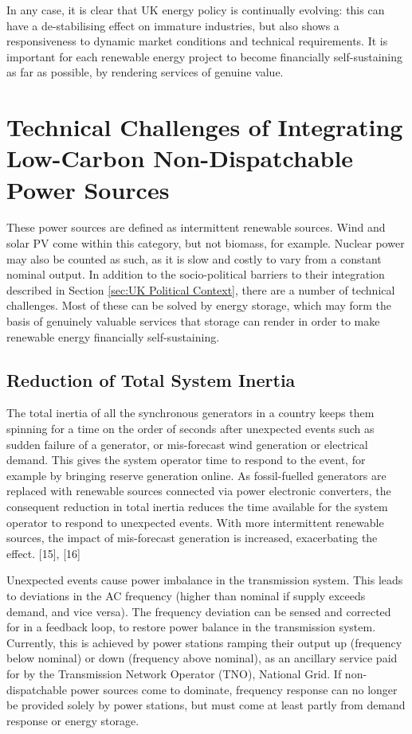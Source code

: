 \documentclass[report_18month.tex]{subfiles}
\begin{document}
In any case, it is clear that UK energy policy is continually evolving: this can have a de-stabilising effect on immature industries, but also shows a responsiveness to dynamic market conditions and technical requirements. It is important for each renewable energy project to become financially self-sustaining as far as possible, by rendering services of genuine value.

\section{Technical Challenges of Integrating Low-Carbon Non-Dispatchable Power Sources}
\label{sec:Technical Challenges of Integrating Low-Carbon Non-Dispatchable Power Sources}
These power sources are defined as intermittent renewable sources. Wind and solar PV come within this category, but not biomass, for example. Nuclear power may also be counted as such, as it is slow and costly to vary from a constant nominal output. In addition to the socio-political barriers to their integration described in Section \ref{sec:UK Political Context}, there are a number of technical challenges. Most of these can be solved by energy storage, which may form the basis of genuinely valuable services that storage can render in order to make renewable energy financially self-sustaining.

\subsection{Reduction of Total System Inertia}
\label{sec:Reduction of Total System Inertia}
The total inertia of all the synchronous generators in a country keeps them spinning for a time on the order of seconds after unexpected events such as sudden failure of a generator, or mis-forecast wind generation or electrical demand. This gives the system operator time to respond to the event, for example by bringing reserve generation online. As fossil-fuelled generators are replaced with renewable sources connected via power electronic converters, the consequent reduction in total inertia reduces the time available for the system operator to respond to unexpected events. With more intermittent renewable sources, the impact of mis-forecast generation is increased, exacerbating the effect. [15], [16]

Unexpected events cause power imbalance in the transmission system. This leads to deviations in the AC frequency (higher than nominal if supply exceeds demand, and vice versa). The frequency deviation can be sensed and corrected for in a feedback loop, to restore power balance in the transmission system. Currently, this is achieved by power stations ramping their output up (frequency below nominal) or down (frequency above nominal), as an ancillary service paid for by the Transmission Network Operator (TNO), National Grid. If non-dispatchable power sources come to dominate, frequency response can no longer be provided solely by power stations, but must come at least partly from demand response or energy storage.
\end{document}
